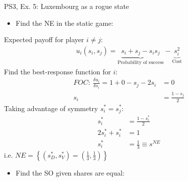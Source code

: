 \begin{frame}{PS3, Ex. 5: Luxembourg as a rogue state}
  \begin{multicols}{2}
    \begin{itemize}
      \item[(a)] Find the NE in the static game:
    \end{itemize}
    Expected payoff for player $i\neq j$:
    \begin{align*}
      u_i(s_i,s_j)=\underbrace{s_i+s_j-s_is_j}_\text{Probability of success}-\underbrace{s_i^2}_\text{Cost}
    \end{align*}
    Find the best-response function for $i$:
    \begin{align*}
      FOC:\ \frac{\delta u_i}{\delta s_i}=1+0-s_j-2s_i&=0\\
       s_i&=\frac{1-s_j}{2}
    \end{align*}
    Taking advantage of symmetry $s_i^{*}=s_j^{*}$:
    \begin{align*}
       s_i^{*}&=\frac{1-s_i^{*}}{2}\\
      2s_i^{*}+s_i^{*}&=1\\
       s_i^{*}&=\frac{1}{3}\equiv s^{NE}
    \end{align*}
    i.e. $NE=\left\{(s_D^{*},s_V^{*})=(\frac{1}{3},\frac{1}{3})\right\}$
  \vfill\null\columnbreak
    \begin{itemize}
      \item[(b)] Find the SO given shares are equal:
    \end{itemize}
  \vfill\null
  \end{multicols}
\end{frame}
